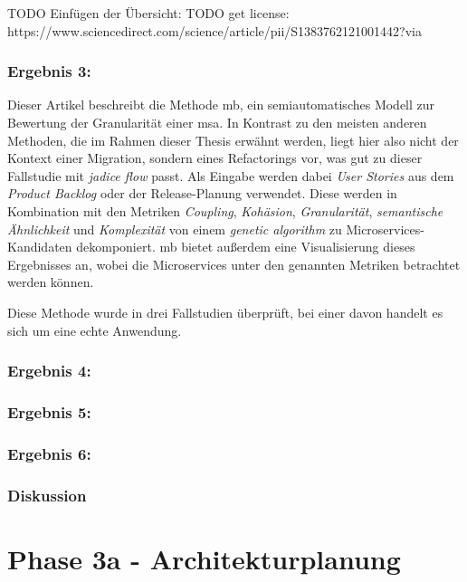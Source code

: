 TODO Einfügen der Übersicht: TODO get license: https://www.sciencedirect.com/science/article/pii/S1383762121001442?via%

\subsubsection{Ergebnis 3: }

Dieser Artikel beschreibt die Methode \gls{mb}, ein semiautomatisches Modell zur Bewertung der Granularität einer \gls{msa}.
In Kontrast zu den meisten anderen Methoden, die im Rahmen dieser Thesis erwähnt werden, liegt hier also nicht der Kontext einer Migration, sondern eines Refactorings vor, was gut zu dieser Fallstudie mit \emph{jadice flow} passt.
Als Eingabe werden dabei \emph{User Stories} aus dem \emph{Product Backlog} oder der Release-Planung verwendet.
Diese werden in Kombination mit den Metriken \emph{Coupling}, \emph{Kohäsion}, \emph{Granularität}, \emph{semantische Ähnlichkeit} und \emph{Komplexität} von einem \emph{genetic algorithm} zu Microservices-Kandidaten dekomponiert.
\gls{mb} bietet außerdem eine Visualisierung dieses Ergebnisses an, wobei die Microservices unter den genannten Metriken betrachtet werden können.

Diese Methode wurde in drei Fallstudien überprüft, bei einer davon handelt es sich um eine echte Anwendung.

\subsubsection{Ergebnis 4: }

\subsubsection{Ergebnis 5: }

\subsubsection{Ergebnis 6: }

\subsubsection{Diskussion}

\section{Phase 3a - Architekturplanung}
\label{sec:durchführung-phase3}
